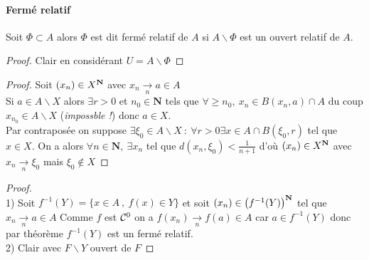 		\traitd
		\paragraph{Fermé relatif}
			Soit $\Phi \subset A$ alors $\Phi$ est dit fermé relatif de $A$ si $A\backslash \Phi$ est un ouvert relatif de $A$. 
		\trait
		
		
		\begin{proof}
		Clair en considérant $U = A\backslash \Phi$
		\end{proof} \medskip
		
		
		\begin{proof}
		\fbox{$\Rightarrow$} Soit $(x_n)\in X^{\mathbf{N}}$ avec $x_n\underset{n}{\to} a\in A$\\ Si $a\in A\backslash X$ alors 
		$\exists r>0$ et $n_0\in \mathbf{N}$ tels que $\forall \geq n_0 ,~ x_n\in B(x_n,a)\cap A$ 
		du coup $x_{n_0} \in A\backslash X$ (\emph{impossble !}) donc $a\in X$.\\
		\fbox{$\Leftarrow$} Par contraposée on suppose $\exists \xi_0 \in A\backslash X ~:~ \forall r>0\exists x\in A\cap B(\xi_0,r)$ 
		tel que $x\in X$. On a alors $\forall n\in \mathbf{N} ,~\exists x_n$ tel que $d(x_n,\xi_0)<\frac{1}{n+1}$ 
		d'où $(x_n) \in X^{\mathbf{N}}$ avec $x_n \underset{n}{\to} \xi_0$ mais $\xi_0\notin X$
		\end{proof} \medskip
		
		
		\begin{proof} ~\\
		{\small 1)} Soit $f^{-1} (Y) = \{x\in A ~,~f(x)\in Y\}$ et soit $(x_n) \in \left( f^{-1} (Y)\right)^{\mathbf{N}}$ 
		tel que $x_n \underset{n}{\to} a\in A$ Comme $f$ est ${\mathcal{C}}^0$ on a $f(x_n) \underset{n}{\to} f(a) \in A$ car $a\in f^{-1}(Y)$
		donc par théorème $f^{-1} (Y)$ est un fermé relatif.\\ 
		{\small 2)} Clair avec $F\backslash Y$ ouvert de $F$
		\end{proof} \medskip
		
